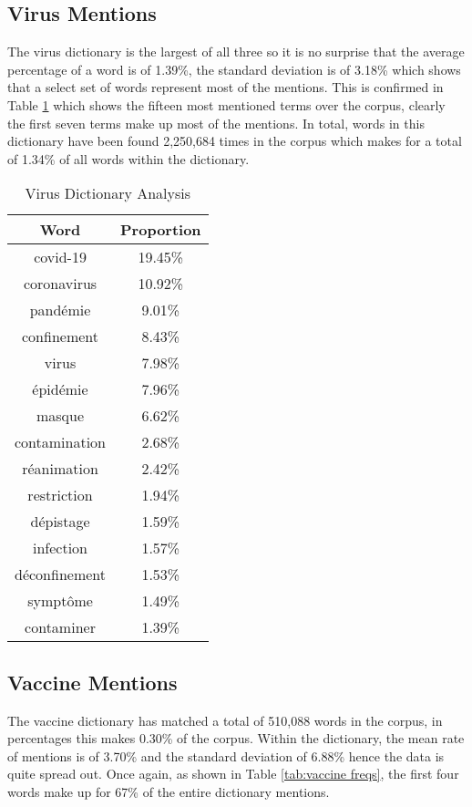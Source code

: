\subsection{Virus Mentions}

The virus dictionary is the largest of all three so it is no surprise that the average percentage of a word is of 1.39\%, the standard deviation is of 3.18\% which shows that a select set of words represent most of the mentions. This is confirmed in Table \ref{tab:virus freqs} which shows the fifteen most mentioned terms over the corpus, clearly the first seven terms make up most of the mentions. In total, words in this dictionary have been found 2,250,684 times in the corpus which makes for a total of 1.34\% of all words within the dictionary.

\begin{table}[]
\caption{Virus Dictionary Analysis}
\label{tab:virus freqs}
\centering
\begin{tabular}{@{}cc@{}}
\toprule
Word      & Proportion \\ \midrule
covid-19      & 19.45\% \\
coronavirus   & 10.92\% \\
pandémie      & 9.01\%  \\
confinement   & 8.43\%  \\
virus         & 7.98\%  \\
épidémie      & 7.96\%  \\
masque        & 6.62\%  \\
contamination & 2.68\%  \\
réanimation   & 2.42\%  \\
restriction   & 1.94\%  \\
dépistage     & 1.59\%  \\
infection     & 1.57\%  \\
déconfinement & 1.53\%  \\
symptôme      & 1.49\%  \\
contaminer    & 1.39\%  \\ \bottomrule
\end{tabular}
\end{table}

\subsection{Vaccine Mentions}

The vaccine dictionary has matched a total of 510,088 words in the corpus, in percentages this makes 0.30\% of the corpus. Within the dictionary, the mean rate of mentions is of 3.70\% and the standard deviation of 6.88\% hence the data is quite spread out. Once again, as shown in Table \ref{tab:vaccine freqs}, the first four words make up for 67\% of the entire dictionary mentions.


